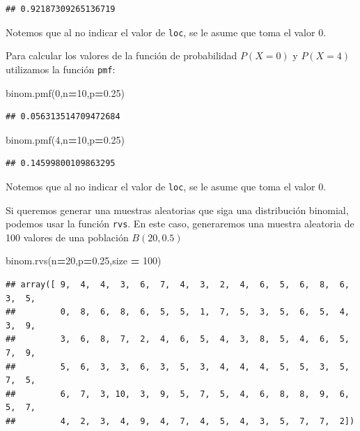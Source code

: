 \documentclass[]{book}
\newenvironment{Shaded}{\begin{snugshade}}{\end{snugshade}}
\newcommand{\DecValTok}[1]{\textcolor[rgb]{0.00,0.00,0.81}{#1}}
\newcommand{\FloatTok}[1]{\textcolor[rgb]{0.00,0.00,0.81}{#1}}
\newcommand{\NormalTok}[1]{#1}
\newcommand{\OperatorTok}[1]{\textcolor[rgb]{0.81,0.36,0.00}{\textbf{#1}}}
\begin{document}
\begin{verbatim}
## 0.92187309265136719
\end{verbatim}

Notemos que al no indicar el valor de \texttt{loc}, se le asume que toma el valor 0.

Para calcular los valores de la función de probabilidad \(P(X=0)\) y \(P(X=4)\) utilizamos la función \texttt{pmf}:

\begin{Shaded}
\begin{Highlighting}[]
\NormalTok{binom.pmf(}\DecValTok{0}\NormalTok{,n}\OperatorTok{=}\DecValTok{10}\NormalTok{,p}\OperatorTok{=}\FloatTok{0.25}\NormalTok{)}
\end{Highlighting}
\end{Shaded}

\begin{verbatim}
## 0.056313514709472684
\end{verbatim}

\begin{Shaded}
\begin{Highlighting}[]
\NormalTok{binom.pmf(}\DecValTok{4}\NormalTok{,n}\OperatorTok{=}\DecValTok{10}\NormalTok{,p}\OperatorTok{=}\FloatTok{0.25}\NormalTok{)}
\end{Highlighting}
\end{Shaded}

\begin{verbatim}
## 0.14599800109863295
\end{verbatim}

Notemos que al no indicar el valor de \texttt{loc}, se le asume que toma el valor 0.

Si queremos generar una muestras aleatorias que siga una distribución binomial, podemos usar la función \texttt{rvs}. En este caso, generaremos una muestra aleatoria de 100 valores de una población \(B(20,0.5)\)

\begin{Shaded}
\begin{Highlighting}[]
\NormalTok{binom.rvs(n}\OperatorTok{=}\DecValTok{20}\NormalTok{,p}\OperatorTok{=}\FloatTok{0.25}\NormalTok{,size }\OperatorTok{=} \DecValTok{100}\NormalTok{)}
\end{Highlighting}
\end{Shaded}

\begin{verbatim}
## array([ 9,  4,  4,  3,  6,  7,  4,  3,  2,  4,  6,  5,  6,  8,  6,  3,  5,
##         0,  8,  6,  8,  6,  5,  5,  1,  7,  5,  3,  5,  6,  5,  4,  3,  9,
##         3,  6,  8,  7,  2,  4,  6,  5,  4,  3,  8,  5,  4,  6,  5,  7,  9,
##         5,  6,  3,  3,  6,  3,  5,  3,  4,  4,  4,  5,  5,  3,  5,  7,  5,
##         6,  7,  3, 10,  3,  9,  5,  7,  5,  4,  6,  8,  8,  9,  6,  5,  7,
##         4,  2,  3,  4,  9,  4,  7,  4,  5,  4,  3,  5,  7,  7,  2])
\end{verbatim}
\end{document}
